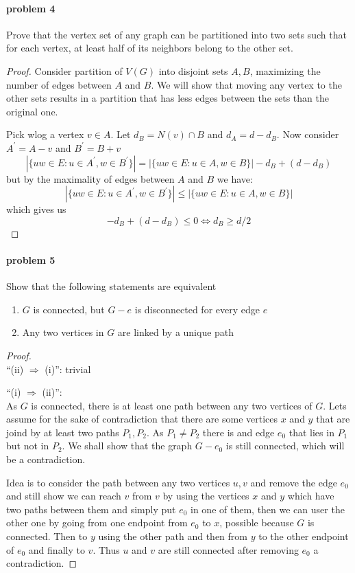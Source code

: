\paragraph{problem 4}
Prove that the vertex set of any graph can be partitioned into two sets such 
that for each vertex, at least half of its neighbors belong to the other set.
\begin{proof}
Consider partition of $ V(G) $ into disjoint sets $ A,B $, maximizing the number 
of edges between $A$ and $B$. We will show that moving any vertex to the other 
sets results in a partition that has less edges 
between the sets than the original one.

\smallskip \noindent
Pick wlog a vertex $ v \in A $. Let $ d_B = N(v) \cap B $ and $ d_A = d - d_B $.
Now consider $ A^\prime = A - v $ and $ B^\prime = B + v $
$$ |\{uw \in E: u \in A^\prime, w \in B^\prime\}| =
|\{uw \in E: u \in A, w \in B\}| - d_B + (d - d_B) $$
but by the maximality of edges between $ A $ and $ B $ we have:
$$|\{uw \in E: u \in A^\prime, w \in B^\prime\}| \leq 
|\{uw \in E: u \in A, w \in B\}|$$
which gives us 
$$ -d_B + (d - d_B) \leq 0 \iff d_B \geq d/2 $$ 
\end{proof}


\paragraph{problem 5}
Show that the following statements are equivalent
\begin{enumerate}
    \item $ G $ is connected, but $ G - e $ is disconnected for every edge $ e $
    \item Any two vertices in $ G $ are linked by a unique path
\end{enumerate}
\begin{proof} $ $ \\
    \enquote{(ii) $\Rightarrow$ (i)}: trivial

    \smallskip \noindent
    \enquote{(i) $\Rightarrow$ (ii)}: $ $ \\
    As $G$ is connected, there is at least one path between any two vertices
    of $G$. Lets assume for the sake of contradiction that there
    are some vertices $ x $ and $y$ that are joind by at least two
    paths $ P_1, P_2$. As $ P_1 \neq P_2 $ there 
    is and edge $e_0$ that lies in $P_1$ but not in $ P_2$. We shall show that 
    the graph $ G - e_0 $ is still connected, which will be a contradiction.

    \smallskip \noindent
    Idea is to consider the path between any two vertices $u,v$ and remove 
    the edge $ e_0 $ and still show we can reach $ v $ from $ v $ by using 
    the vertices $ x $ and $ y $ which have two paths between them and simply put 
    $ e_0 $ in one of them, then we can user the other one by going from one 
    endpoint  from $e_0$ to $x$, possible because 
    $ G $ is connected. Then to $y$ using the other path and then from 
    $y$ to the other endpoint of $e_0$ and finally to $v$.
    Thus $u$ and $v$ are still connected after removing $e_0$ a contradiction. 

\end{proof}

